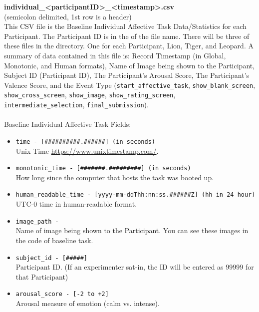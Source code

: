 \begin{description}
\begin{addmargin}[0em]{0em}
        \begin{addmargin}[1em]{0em} %
            \textbf{individual\_<participantID>\_<timestamp>.csv}\\(semicolon delimited, 1st row is a header)\\
            This CSV file is the Baseline Individual Affective Task Data/Statistics for
            each Participant. The Participant ID is in the of the file name. There will be
            three of these files in the directory. One for each Participant, Lion, Tiger,
            and Leopard. A summary of data contained in this file is: Record Timestamp (in
            Global, Monotonic, and Human formats), Name of Image being shown to the
            Participant, Subject ID (Participant ID), The Participant's Arousal Score, The
            Participant's Valence Score, and the Event Type (\verb|start_affective_task|,
            \verb|show_blank_screen|, \verb|show_cross_screen|, \verb|show_image|,
            \verb|show_rating_screen|, \verb|intermediate_selection|,
            \verb|final_submission|).\\\\
            Baseline Individual Affective Task Fields:
            \begin{itemize}
                \item \verb|time - [##########.######] (in seconds)|\\Unix Time \href{https://www.unixtimestamp.com/}{https://www.unixtimestamp.com/}.
                \item \verb|monotonic_time - [#######.#########] (in seconds)|\\How long since the computer that hosts the task was booted up.
                \item \verb|human_readable_time - [yyyy-mm-ddThh:nn:ss.######Z] (hh in 24 hour)|\\ UTC-0 time in human-readable format.
                \item \verb|image_path -|\\Name of image being shown to the Participant. You can see these images in the code of baseline task.
                \item \verb|subject_id - [#####]|\\Participant ID. (If an experimenter sat-in, the ID will be entered as 99999 for that Participant)
                \item \verb|arousal_score - [-2 to +2]|\\Arousal measure of emotion (calm vs. intense).

\end{itemize}
\end{addmargin}
\end{addmargin}
\end{description}
